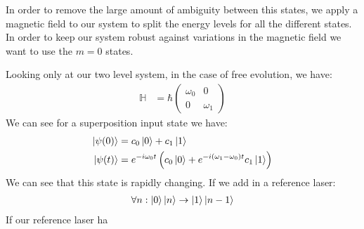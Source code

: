 In order to remove the large amount of ambiguity between this states, we apply a magnetic field to our system to split the energy levels for all the different states.
In order to keep our system robust against variations in the magnetic field we want to use the $m=0$ states.

Looking only at our two level system, in the case of free evolution, we have:
\begin{align*}
	\mathbb{H} &= \hbar \begin{pmatrix}
		\omega_0 & 0 \\
		0 & \omega_1
			    \end{pmatrix}
\end{align*}
We can see for a superposition input state we have:
\begin{align*}
	\ket{\psi(0)} &= c_0\ket{0} + c_1\ket{1} \\
	\ket{\psi(t)} &= e^{-i\omega_0 t} \left(c_0\ket{0} + e^{-i(\omega_1-\omega_0)t} c_1\ket{1}\right)
\end{align*}
We can see that this state is rapidly changing. If we add in a reference laser:
\begin{align*}
	\forall n: \ket{0}\ket{n} \to \ket{1}\ket{n-1}
\end{align*}
If our reference laser ha
